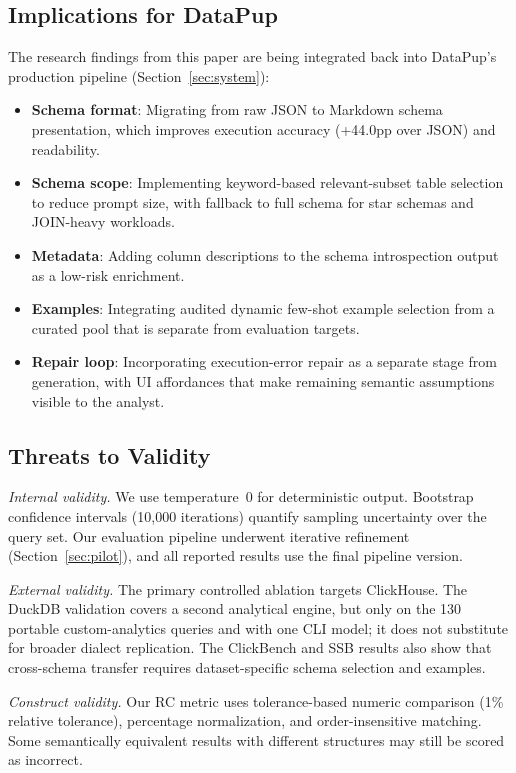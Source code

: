 \documentclass[sigconf, nonacm]{acmart}
\begin{document}
\subsection{Implications for DataPup}
\label{sec:implications}
The research findings from this paper are being integrated back into DataPup's production pipeline (Section~\ref{sec:system}):
\begin{itemize}
    \item \textbf{Schema format}: Migrating from raw JSON to Markdown schema presentation, which improves execution accuracy (+44.0pp over JSON) and readability.
    \item \textbf{Schema scope}: Implementing keyword-based relevant-subset table selection to reduce prompt size, with fallback to full schema for star schemas and JOIN-heavy workloads.
    \item \textbf{Metadata}: Adding column descriptions to the schema introspection output as a low-risk enrichment.
    \item \textbf{Examples}: Integrating audited dynamic few-shot example selection from a curated pool that is separate from evaluation targets.
    \item \textbf{Repair loop}: Incorporating execution-error repair as a separate stage from generation, with UI affordances that make remaining semantic assumptions visible to the analyst.
\end{itemize}

\subsection{Threats to Validity}
\emph{Internal validity.} We use temperature~0 for deterministic output. Bootstrap confidence intervals (10{,}000 iterations) quantify sampling uncertainty over the query set. Our evaluation pipeline underwent iterative refinement (Section~\ref{sec:pilot}), and all reported results use the final pipeline version.

\emph{External validity.} The primary controlled ablation targets ClickHouse. The DuckDB validation covers a second analytical engine, but only on the 130 portable custom-analytics queries and with one CLI model; it does not substitute for broader dialect replication. The ClickBench and SSB results also show that cross-schema transfer requires dataset-specific schema selection and examples.

\emph{Construct validity.} Our RC metric uses tolerance-based numeric comparison (1\% relative tolerance), percentage normalization, and order-insensitive matching. Some semantically equivalent results with different structures may still be scored as incorrect.
\end{document}
